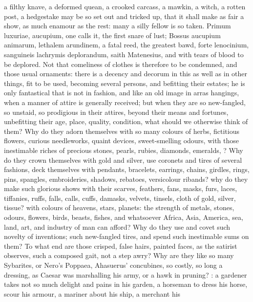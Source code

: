 a filthy knave, a deformed quean, a crooked carcass, a mawkin, a witch,
a rotten post, a hedgestake may be so set out and tricked up, that it
shall make as fair a show, as much enamour as the rest: many a silly
fellow is so taken. Primum luxuriae, aucupium, one calls it, the first
snare of lust; Bossus aucupium animarum, lethalem arundinem, a
fatal reed, the greatest bawd, forte lenocinium, sanguineis lachrymis
deplorandum, saith Matenesius, and with tears of blood to be
deplored. Not that comeliness of clothes is therefore to be condemned,
and those usual ornaments: there is a decency and decorum in this as
well as in other things, fit to be used, becoming several persons, and
befitting their estates; he is only fantastical that is not in fashion,
and like an old image in arras hangings, when a manner of attire is
generally received; but when they are so new-fangled, so unstaid, so
prodigious in their attires, beyond their means and fortunes,
unbefitting their age, place, quality, condition, what should we
otherwise think of them? Why do they adorn themselves with so many
colours of herbs, fictitious flowers, curious needleworks, quaint
devices, sweet-smelling odours, with those inestimable riches of
precious stones, pearls, rubies, diamonds, emeralds, \etc{}? Why do they
crown themselves with gold and silver, use coronets and tires of
several fashions, deck themselves with pendants, bracelets, earrings,
chains, girdles, rings, pins, spangles, embroideries, shadows,
rebatoes, versicolour ribands? why do they make such glorious shows
with their scarves, feathers, fans, masks, furs, laces, tiffanies,
ruffs, falls, calls, cuffs, damasks, velvets, tinsels, cloth of gold,
silver, tissue? with colours of heavens, stars, planets: the strength
of metals, stones, odours, flowers, birds, beasts, fishes, and
whatsoever Africa, Asia, America, sea, land, art, and industry of man
can afford? Why do they use and covet such novelty of inventions; such
new-fangled tires, and spend such inestimable sums on them? To what end
are those crisped, false hairs, painted faces, as the satirist
observes, such a composed gait, not a step awry? Why are they like so
many Sybarites, or Nero's Poppaea, Ahasuerus' concubines, so costly, so
long a dressing, as Caesar was marshalling his army, or a hawk in
pruning? : a gardener
takes not so much delight and pains in his garden, a horseman to dress
his horse, scour his armour, a mariner about his ship, a merchant his
